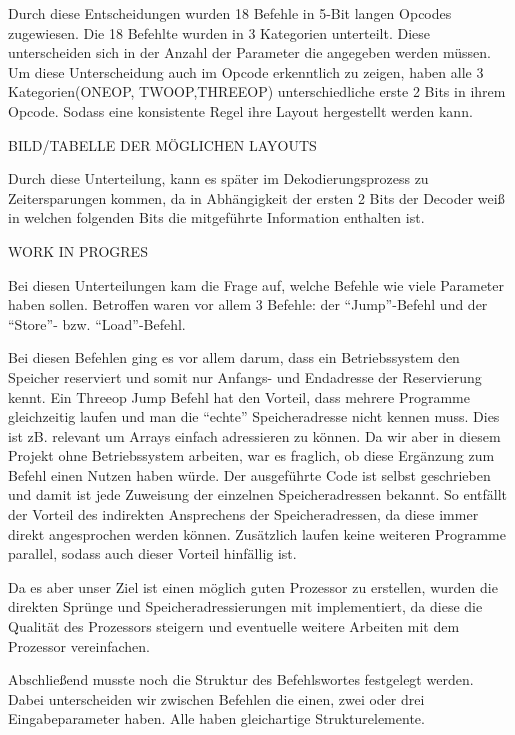 \documentclass[paper=a4,fontsize=12pt,twocolumn]{scrreprt}
\begin{document}
{\color{red}Durch diese Entscheidungen wurden 18 Befehle in 5-Bit langen Opcodes zugewiesen. Die 18 Befehlte wurden in 3 Kategorien unterteilt. Diese unterscheiden sich in der Anzahl der Parameter die angegeben werden müssen. Um diese Unterscheidung auch im Opcode erkenntlich zu zeigen, haben alle 3 Kategorien(ONEOP, TWOOP,THREEOP) unterschiedliche erste 2 Bits in ihrem Opcode. Sodass eine konsistente Regel ihre Layout hergestellt werden kann.

BILD/TABELLE DER MÖGLICHEN LAYOUTS

Durch diese Unterteilung, kann es später im Dekodierungsprozess zu Zeitersparungen kommen, da in Abhängigkeit der ersten 2 Bits der Decoder weiß in welchen folgenden Bits die mitgeführte Information enthalten ist.

{\color{green} WORK IN PROGRES}

Bei diesen Unterteilungen kam die Frage auf, welche Befehle wie viele Parameter haben sollen.
Betroffen waren vor allem 3 Befehle: der \enquote{Jump}-Befehl und der \enquote{Store}- bzw. \enquote{Load}-Befehl.}
Bei diesen Befehlen ging es vor allem darum, dass ein Betriebssystem den Speicher reserviert und somit nur Anfangs- und Endadresse der Reservierung kennt.
Ein Threeop Jump Befehl hat den Vorteil, dass mehrere Programme gleichzeitig laufen und man die \enquote{echte} Speicheradresse nicht kennen muss.
Dies ist zB. relevant um Arrays einfach adressieren zu können.
Da wir aber in diesem Projekt ohne Betriebssystem arbeiten, war es fraglich, ob diese Ergänzung zum Befehl einen Nutzen haben würde.
Der ausgeführte Code ist selbst geschrieben und damit ist jede Zuweisung der einzelnen Speicheradressen bekannt.
So entfällt der Vorteil des indirekten Ansprechens der Speicheradressen, da diese immer direkt angesprochen werden können.
Zusätzlich laufen keine weiteren Programme parallel, sodass auch dieser Vorteil hinfällig ist.

Da es aber unser Ziel ist einen möglich guten Prozessor zu erstellen, wurden die direkten Sprünge und Speicheradressierungen mit implementiert, da diese die Qualität des Prozessors steigern und eventuelle weitere Arbeiten mit dem Prozessor vereinfachen.

Abschließend musste noch die Struktur des Befehlswortes festgelegt werden. Dabei unterscheiden wir zwischen Befehlen die einen, zwei oder drei Eingabeparameter haben.
Alle haben gleichartige Strukturelemente.
\end{document}
